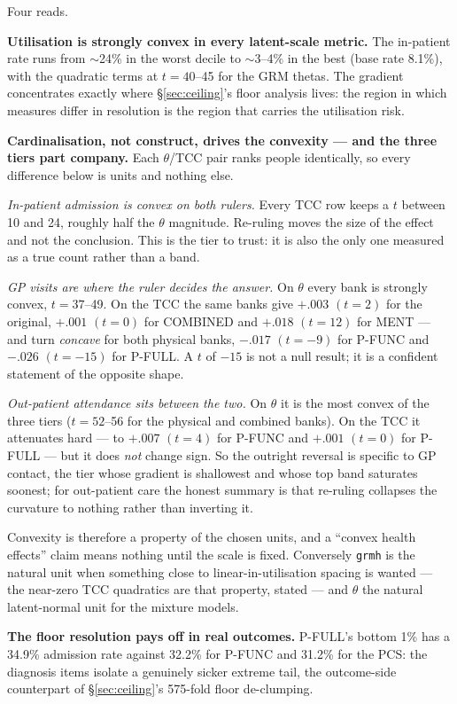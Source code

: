 \documentclass[11pt]{article}
\newcommand{\code}[1]{\texttt{\small #1}}
\begin{document}
Four reads.

\textbf{Utilisation is strongly convex in every latent-scale metric.} The
in-patient rate runs from $\sim$24\% in the worst decile to $\sim$3--4\% in
the best (base rate 8.1\%), with the quadratic terms at $t = 40$--45 for the
GRM thetas. The gradient concentrates exactly where \S\ref{sec:ceiling}'s
floor analysis lives: the region in which measures differ in resolution is
the region that carries the utilisation risk.

\textbf{Cardinalisation, not construct, drives the convexity --- and the
three tiers part company.} Each $\theta$/TCC pair ranks people identically,
so every difference below is units and nothing else.

\emph{In-patient admission is convex on both rulers.} Every TCC row keeps a
$t$ between 10 and 24, roughly half the $\theta$ magnitude. Re-ruling moves
the size of the effect and not the conclusion. This is the tier to trust:
it is also the only one measured as a true count rather than a band.

\emph{GP visits are where the ruler decides the answer.} On $\theta$ every
bank is strongly convex, $t = 37$--49. On the TCC the same banks give $+.003$
$(t=2)$ for the original, $+.001$ $(t=0)$ for COMBINED and $+.018$ $(t=12)$
for MENT --- and turn \emph{concave} for both physical banks, $-.017$ $(t=-9)$
for P-FUNC and $-.026$ $(t=-15)$ for P-FULL. A $t$ of $-15$ is not a null
result; it is a confident statement of the opposite shape.

\emph{Out-patient attendance sits between the two.} On $\theta$ it is the
most convex of the three tiers ($t = 52$--56 for the physical and combined
banks). On the TCC it attenuates hard --- to $+.007$ $(t=4)$ for P-FUNC and
$+.001$ $(t=0)$ for P-FULL --- but it does \emph{not} change sign. So the
outright reversal is specific to GP contact, the tier whose gradient is
shallowest and whose top band saturates soonest; for out-patient care the
honest summary is that re-ruling collapses the curvature to nothing rather
than inverting it.

Convexity is therefore a property of the chosen units, and a ``convex health
effects'' claim means nothing until the scale is fixed. Conversely
\code{grmh} is the natural unit when something close to
linear-in-utilisation spacing is wanted --- the near-zero TCC quadratics are
that property, stated --- and $\theta$ the natural latent-normal unit for the
mixture models.

\textbf{The floor resolution pays off in real outcomes.} P-FULL's bottom
1\% has a 34.9\% admission rate against 32.2\% for P-FUNC and 31.2\% for the
PCS: the diagnosis items isolate a genuinely sicker extreme tail, the
outcome-side counterpart of \S\ref{sec:ceiling}'s 575-fold floor
de-clumping.
\end{document}
